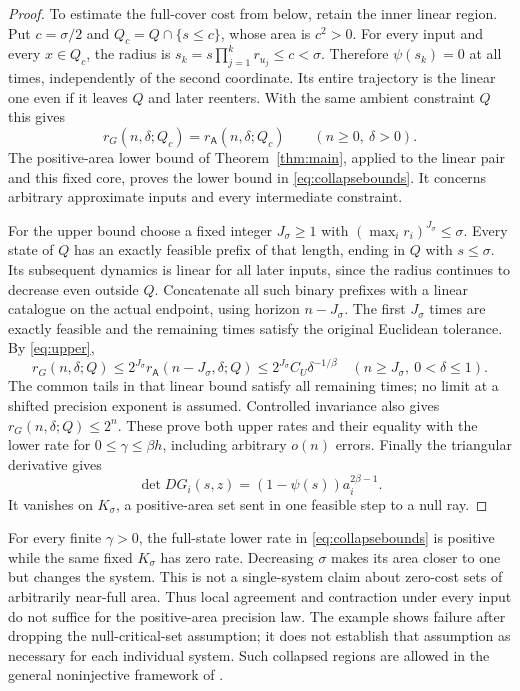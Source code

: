 \documentclass[11pt]{amsart}
\theoremstyle{definition}
\theoremstyle{remark}
\numberwithin{equation}{section}
\begin{document}
\begin{proof}
To estimate the full-cover cost from below, retain the inner
linear region. Put $c=\sigma/2$ and
$Q_c=Q\cap\{s\le c\}$, whose area is $c^2>0$.
For every input and every $x\in Q_c$, the radius is
$s_k=s\prod_{j=1}^k r_{u_j}\le c<\sigma$.
Therefore $\psi(s_k)=0$ at all times, independently of the
second coordinate. Its entire trajectory is the linear one even
if it leaves $Q$ and later reenters. With the same ambient
constraint $Q$ this gives
\begin{equation}\label{eq:collapsecore}
r_G(n,\delta;Q_c)=r_{\mathsf A}(n,\delta;Q_c)
                       \qquad(n\ge0,\ \delta>0).
\end{equation}
The positive-area lower bound of Theorem~\ref{thm:main}, applied
to the linear pair and this fixed core, proves the lower bound
in \eqref{eq:collapsebounds}. It concerns arbitrary approximate
inputs and every intermediate constraint.

For the upper bound choose a fixed integer $J_\sigma\ge1$ with
$(\max_i r_i)^{J_\sigma}\le\sigma$. Every state of $Q$ has an
exactly feasible prefix of that length, ending in $Q$ with
$s\le\sigma$. Its subsequent dynamics is linear for all later
inputs, since the radius continues to decrease even outside $Q$.
Concatenate all such binary prefixes with a linear catalogue on
the actual endpoint, using horizon $n-J_\sigma$. The first
$J_\sigma$ times are exactly feasible and the remaining times
satisfy the original Euclidean tolerance. By \eqref{eq:upper},
\[
r_G(n,\delta;Q)\le
2^{J_\sigma}r_{\mathsf A}(n-J_\sigma,\delta;Q)
\le 2^{J_\sigma}C_U\delta^{-1/\beta}
\quad(n\ge J_\sigma,\ 0<\delta\le1).
\]
The common tails in that linear bound satisfy all remaining times;
no limit at a shifted precision exponent is assumed. Controlled
invariance also gives $r_G(n,\delta;Q)\le2^n$.
These prove both upper rates and their equality with the lower rate
for $0\le\gamma\le\beta h$, including arbitrary $o(n)$ errors.
Finally the triangular derivative gives
\[
\det DG_i(s,z)=(1-\psi(s))a_i^{2\beta-1}.
\]
It vanishes on $K_\sigma$, a positive-area set sent in one
feasible step to a null ray.
\end{proof}

For every finite $\gamma>0$, the full-state lower rate in
\eqref{eq:collapsebounds} is positive while the same fixed
$K_\sigma$ has zero rate. Decreasing $\sigma$ makes its area
closer to one but changes the system. This is not a single-system
claim about zero-cost sets of arbitrarily near-full area.
Thus local agreement and contraction under every input do not
suffice for the positive-area precision law. The example shows
failure after dropping the null-critical-set assumption; it does
not establish that assumption as necessary for each individual
system. Such collapsed regions are allowed in the general
noninjective framework of \cite{CZ2024}.
\end{document}
